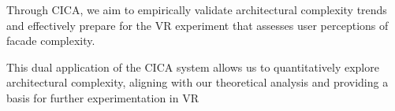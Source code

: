 Through CICA, we aim to empirically validate architectural complexity trends and effectively prepare for the VR experiment that assesses user perceptions of facade complexity.

This dual application of the CICA system allows us to quantitatively explore architectural complexity, aligning with our theoretical analysis and providing a basis for further experimentation in VR



%
%
%
